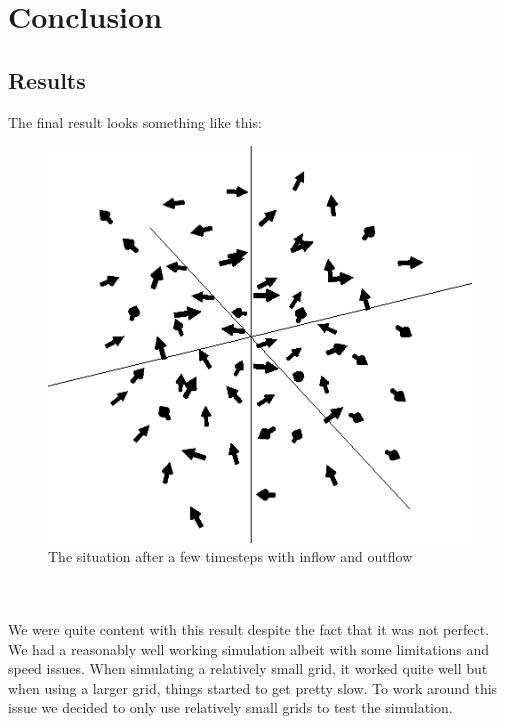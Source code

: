 \documentclass{article}
\begin{document}
\newpage
\section{Conclusion} \label{Conclusion}
\subsection{Results}
The final result looks something like this:
\begin{figure}[h]
\includegraphics[width=\textwidth]{result1}
\centering
\caption{The situation after a few timesteps with inflow and outflow}
\end{figure}
\\ \\
We were quite content with this result despite the fact that it was not perfect. We had a reasonably well working simulation albeit with some limitations and speed issues. When simulating a relatively small grid, it worked quite well but when using a larger grid, things started to get pretty slow. To work around this issue we decided to only use relatively small grids to test the simulation.
\end{document}
